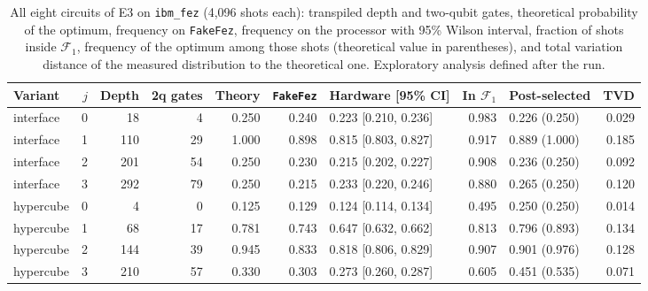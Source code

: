\begin{table}[t]
\centering
\caption{All eight circuits of E3 on \texttt{ibm\_fez} (4{,}096 shots each): transpiled depth and two-qubit gates, theoretical probability of the optimum, frequency on \texttt{FakeFez}, frequency on the processor with 95\% Wilson interval, fraction of shots inside $\mathcal{F}_1$, frequency of the optimum among those shots (theoretical value in parentheses), and total variation distance of the measured distribution to the theoretical one. Exploratory analysis defined after the run.}\label{tab:hardware-all}
\footnotesize
\begin{tabular}{lrrrrrlrlr}
\toprule
Variant & $j$ & Depth & 2q gates & Theory & \texttt{FakeFez} & Hardware [95\% CI] & In $\mathcal{F}_1$ & Post-selected & TVD \\
\midrule
interface & 0 & 18 & 4 & 0.250 & 0.240 & 0.223 [0.210, 0.236] & 0.983 & 0.226 (0.250) & 0.029 \\
interface & 1 & 110 & 29 & 1.000 & 0.898 & 0.815 [0.803, 0.827] & 0.917 & 0.889 (1.000) & 0.185 \\
interface & 2 & 201 & 54 & 0.250 & 0.230 & 0.215 [0.202, 0.227] & 0.908 & 0.236 (0.250) & 0.092 \\
interface & 3 & 292 & 79 & 0.250 & 0.215 & 0.233 [0.220, 0.246] & 0.880 & 0.265 (0.250) & 0.120 \\
hypercube & 0 & 4 & 0 & 0.125 & 0.129 & 0.124 [0.114, 0.134] & 0.495 & 0.250 (0.250) & 0.014 \\
hypercube & 1 & 68 & 17 & 0.781 & 0.743 & 0.647 [0.632, 0.662] & 0.813 & 0.796 (0.893) & 0.134 \\
hypercube & 2 & 144 & 39 & 0.945 & 0.833 & 0.818 [0.806, 0.829] & 0.907 & 0.901 (0.976) & 0.128 \\
hypercube & 3 & 210 & 57 & 0.330 & 0.303 & 0.273 [0.260, 0.287] & 0.605 & 0.451 (0.535) & 0.071 \\
\bottomrule
\end{tabular}
\end{table}
